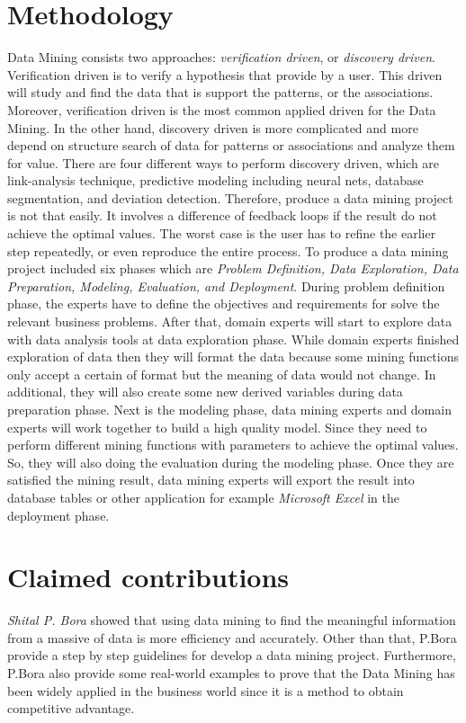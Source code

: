 \documentclass[a4paper,12pt]{article}
\begin{document}
\section{Methodology}
\hspace*{1cm}Data Mining consists two approaches: \textit{verification driven}, or \textit{discovery driven}. Verification driven is to verify a hypothesis that provide by a user. This driven will study and find the data that is support the patterns, or the associations. Moreover, verification driven is the most common applied driven for the Data Mining. In the other hand, discovery driven is more complicated and more depend on structure search of data for patterns or associations and analyze them for value. There are four different ways to perform discovery driven, which are link-analysis technique, predictive modeling including neural nets, database segmentation, and deviation detection. Therefore, produce a data mining project is not that easily. It involves a difference of feedback loops if the result do not achieve the optimal values. The worst case is the user has to refine the earlier step repeatedly, or even reproduce the entire process. To produce a data mining project included six phases which are \textit{Problem Definition, Data Exploration, Data Preparation, Modeling, Evaluation, and Deployment}. During problem definition phase, the experts have to define the objectives and requirements for solve the relevant business problems. After that, domain experts will start to explore data with data analysis tools at data exploration phase. While domain experts finished exploration of data then they will format the data because some mining functions only accept a certain of format but the meaning of data would not change. In additional, they will also create some new derived variables during data preparation phase. Next is the modeling phase, data mining experts and domain experts will work together to build a high quality model. Since they need to perform different mining functions with parameters to achieve the optimal values. So, they will also doing the evaluation during the modeling phase. Once they are satisfied the mining result, data mining experts will export the result into database tables or other application for example \textit{Microsoft Excel} in the deployment phase. 
\section{Claimed contributions}
\hspace*{1cm}\textit{Shital P. Bora} showed that using data mining to find the meaningful information from a massive of data is more efficiency and accurately. Other than that, P.Bora provide a step by step guidelines for develop a data mining project.  Furthermore, P.Bora also provide some real-world examples to prove that the Data Mining has been widely applied in the business world since it is a method to obtain competitive advantage.
\end{document}
